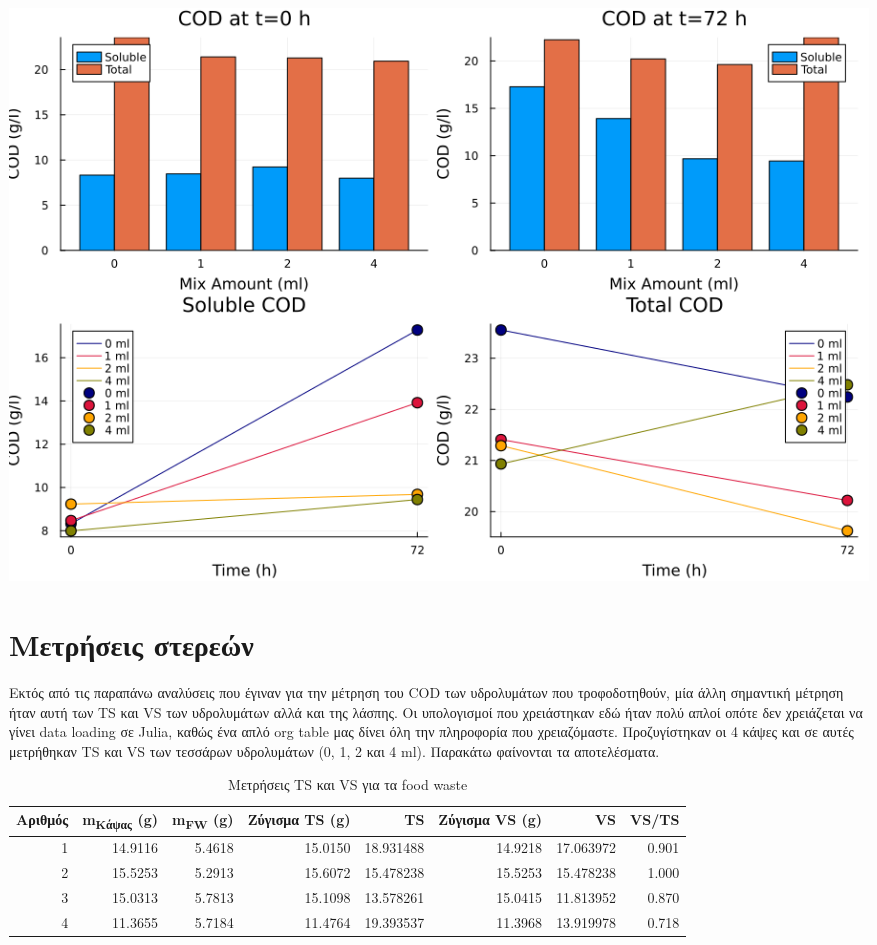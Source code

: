 \documentclass[11pt]{article}
\begin{document}
\begin{center}
\includegraphics[width=.9\linewidth]{../plots/26_03/complete_cod_plot_26_03.png}
\end{center}

\section{Μετρήσεις στερεών}
\label{sec:org98dd245}
Εκτός από τις παραπάνω αναλύσεις που έγιναν για την μέτρηση του COD των υδρολυμάτων που τροφοδοτηθούν, μία άλλη σημαντική μέτρηση ήταν αυτή των TS και VS των υδρολυμάτων αλλά και της λάσπης. Οι υπολογισμοί που χρειάστηκαν εδώ ήταν πολύ απλοί οπότε δεν χρειάζεται να γίνει data loading σε Julia, καθώς ένα απλό org table μας δίνει όλη την πληροφορία που χρειαζόμαστε. Προζυγίστηκαν οι 4 κάψες και σε αυτές μετρήθηκαν TS και VS των τεσσάρων υδρολυμάτων (0, 1, 2 και 4 ml). Παρακάτω φαίνονται τα αποτελέσματα.

\begin{table}[htbp]
\caption{Μετρήσεις TS και VS για τα food waste}
\centering
\begin{tabular}{rrrrrrrr}
Αριθμός & m\textsubscript{Κάψας} (g) & m\textsubscript{FW} (g) & Ζύγισμα TS (g) & TS & Ζύγισμα VS (g) & VS & VS/TS\\[0pt]
\hline
1 & 14.9116 & 5.4618 & 15.0150 & 18.931488 & 14.9218 & 17.063972 & 0.901\\[0pt]
2 & 15.5253 & 5.2913 & 15.6072 & 15.478238 & 15.5253 & 15.478238 & 1.000\\[0pt]
3 & 15.0313 & 5.7813 & 15.1098 & 13.578261 & 15.0415 & 11.813952 & 0.870\\[0pt]
4 & 11.3655 & 5.7184 & 11.4764 & 19.393537 & 11.3968 & 13.919978 & 0.718\\[0pt]
\end{tabular}
\end{table}
\end{document}
